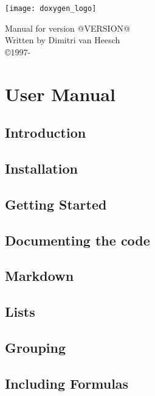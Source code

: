 \documentclass{book}
\newcommand{\+}{\discretionary{\mbox{\scriptsize$\hookleftarrow$}}{}{}}
\newcommand{\thisyear}{\the\year}
\begin{document}
\begin{titlepage}
\texttt{[image: doxygen\_logo]}
\begin{center}
Manual for version @VERSION@\\[2ex]
Written by Dimitri van Heesch\\[2ex]
\copyright 1997-\thisyear
\end{center}
\end{titlepage}
\clearemptydoublepage
{}
\tableofcontents
\clearemptydoublepage
{}
\part{User Manual}
\chapter{Introduction}\label{intro}\hypertarget{intro}{}
\chapter{Installation}\label{install}\hypertarget{install}{}
\chapter{Getting Started}\label{starting}\hypertarget{starting}{}
\chapter{Documenting the code}\label{docblocks}\hypertarget{docblocks}{}
\chapter{Markdown}\label{markdown}\hypertarget{markdown}{}
\chapter{Lists}\label{lists}\hypertarget{lists}{}
\chapter{Grouping}\label{grouping}\hypertarget{grouping}{}
\chapter{Including Formulas}\label{formulas}\hypertarget{formulas}{}
\end{document}
